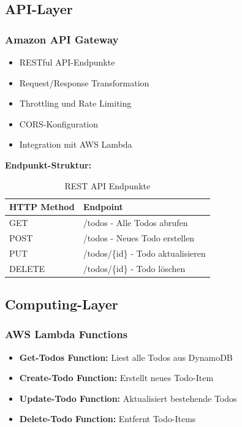 \subsection{API-Layer}

\subsubsection{Amazon API Gateway}

\begin{itemize}
    \item RESTful API-Endpunkte
    \item Request/Response Transformation
    \item Throttling und Rate Limiting
    \item CORS-Konfiguration
    \item Integration mit AWS Lambda
\end{itemize}

\textbf{Endpunkt-Struktur:}
\begin{table}[H]
    \centering
    \begin{tabular}{@{}ll@{}}
        \toprule
        \textbf{HTTP Method} & \textbf{Endpoint} \\
        \midrule
        GET & /todos - Alle Todos abrufen \\
        POST & /todos - Neues Todo erstellen \\
        PUT & /todos/\{id\} - Todo aktualisieren \\
        DELETE & /todos/\{id\} - Todo löschen \\
        \bottomrule
    \end{tabular}
    \caption{REST API Endpunkte}
    \label{tab:endpoints}
\end{table}

\subsection{Computing-Layer}

\subsubsection{AWS Lambda Functions}

\begin{itemize}
    \item \textbf{Get-Todos Function:} Liest alle Todos aus DynamoDB
    \item \textbf{Create-Todo Function:} Erstellt neues Todo-Item
    \item \textbf{Update-Todo Function:} Aktualisiert bestehende Todos
    \item \textbf{Delete-Todo Function:} Entfernt Todo-Items
\end{itemize}

